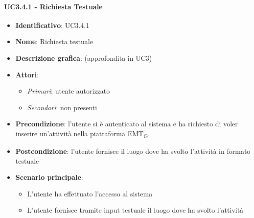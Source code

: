 \paragraph{UC3.4.1 - Richiesta Testuale}
\begin{itemize}
   \item \textbf{Identificativo}: UC3.4.1
   \item \textbf{Nome}: Richiesta testuale
   \item \textbf{Descrizione grafica}: (approfondita in UC3)
   \item \textbf{Attori}:
   \begin{itemize} 
       \item \textit{Primari}: utente autorizzato
       \item \textit{Secondari}: non presenti
   \end{itemize}
       \item \textbf{Precondizione}: l'utente si è autenticato al sistema e ha richiesto di voler inserire un'attività nella piattaforma EMT\textsubscript{G}. 
       \item \textbf{Postcondizione}: l'utente fornisce il luogo dove ha svolto l'attività in formato testuale
    \item \textbf{Scenario principale}: 
       \begin{itemize}
           \item L'utente ha effettuato l'accesso al sistema 
           \item L'utente fornisce tramite input testuale il luogo dove ha svolto l'attività
       \end{itemize}
\end{itemize}

